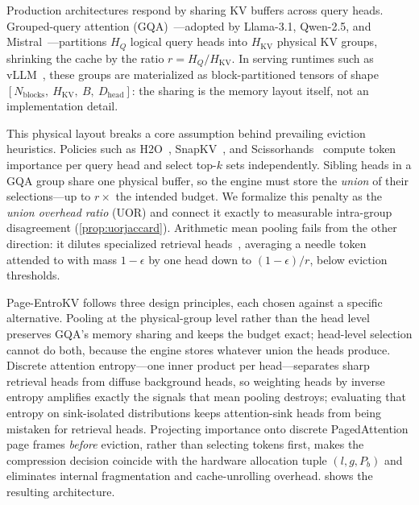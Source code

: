 \documentclass[final,5p,times,twocolumn]{elsarticle}
\theoremstyle{definition}
\theoremstyle{remark}
\newcommand{\method}{Page-EntroKV}
\newcommand{\HQ}{H_{Q}}
\newcommand{\HKV}{H_{\mathrm{KV}}}
\newcommand{\Dhead}{D_{\mathrm{head}}}
\newcommand{\Nblk}{N_{\mathrm{blocks}}}
\begin{document}
Production architectures respond by sharing KV buffers across query
heads. Grouped-query attention (GQA)~\cite{ainslie2023gqa}---adopted by
Llama-3.1, Qwen-2.5, and
Mistral~\cite{meta2024llama3,qwen2024qwen25,jiang2023mistral}---partitions
 $\HQ$ logical query heads into $\HKV$ physical KV groups, shrinking the
cache by the ratio $r=\HQ/\HKV$. In serving runtimes such as
vLLM~\cite{kwon2023vllm}, these groups are materialized as
block-partitioned tensors of shape $[\Nblk,\ \HKV,\ B,\ \Dhead]$:
the sharing is the memory layout itself, not an implementation detail.

This physical layout breaks a core assumption behind prevailing eviction
heuristics. Policies such as H2O~\cite{zhang2023h2o},
SnapKV~\cite{li2024snapkv}, and Scissorhands~\cite{liu2023scissorhands}
compute token importance per query head and select top-$k$ sets
independently. Sibling heads in a GQA group share one physical buffer,
so the engine must store the \emph{union} of their selections---up to
 $r\times$ the intended budget. We formalize this penalty as the
\emph{union overhead ratio} (UOR) and connect it exactly to measurable
intra-group disagreement (\cref{prop:uorjaccard}). Arithmetic mean
pooling fails from the other direction: it dilutes specialized retrieval
heads~\cite{wu2024retrievalheads}, averaging a needle token attended to
with mass $1-\epsilon$ by one head down to $(1-\epsilon)/r$, below
eviction thresholds.

\method{} follows three design principles, each chosen against a
specific alternative. Pooling at the physical-group level rather than
the head level preserves GQA's memory sharing and keeps the budget
exact; head-level selection cannot do both, because the engine stores
whatever union the heads produce. Discrete attention
entropy---one inner product per head---separates sharp retrieval heads
from diffuse background heads, so weighting heads by inverse entropy
amplifies exactly the signals that mean pooling destroys; evaluating
that entropy on sink-isolated distributions keeps attention-sink heads
from being mistaken for retrieval heads. Projecting importance onto
discrete PagedAttention page frames \emph{before} eviction, rather than
selecting tokens first, makes the compression decision coincide with the
hardware allocation tuple $(l, g, P_b)$ and eliminates internal
fragmentation and cache-unrolling overhead.
 shows the resulting architecture.
\end{document}

